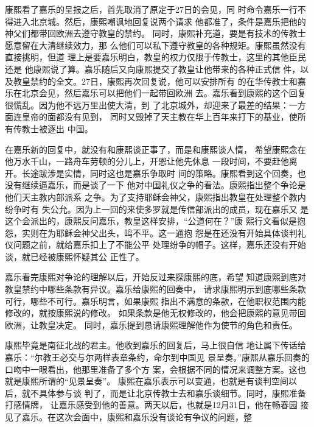 \par
康熙看了嘉乐的呈报之后，首先取消了原定于27日的会见，同%
时命令嘉乐一行不得进入北京城。然后，康熙嘲讽地回复说两个请求%
他都准了，条件是嘉乐把他的神父们都带回欧洲去遵守教皇的禁约。%
同时，康熙补充道，要是有技术的传教士愿意留在大清继续效力，那%
么他们可以私下遵守教皇的各种规矩。康熙虽然没有直接挑明，但道%
理上是要嘉乐明白，教皇的权力仅限于传教士，这里的其他臣民还是%
他康熙说了算。嘉乐随后又向康熙提交了教皇让他带来的各种正式信%
件，以及教皇禁约的全文。27日，康熙再次回复说，他可以安排所有%
的在华传教士和嘉乐在北京会见，然后嘉乐可以把他们一起带回欧洲%
去。嘉乐看到康熙的这个回复很慌乱。因为他不远万里出使大清，到%
了北京城外，却迎来了最差的结果：一方面连皇帝的面都没有见到，%
同时又毁掉了天主教在华上百年来打下的基业，使所有传教士被逐出%
中国。%
\par
在嘉乐新的回复中，就没有和康熙谈正事了，而是和康熙谈人情，%
希望康熙念在他万水千山，一路舟车劳顿的分儿上，开恩让他先休息%
一段时间，不要赶他离开。长途跋涉是实情，同时这也是嘉乐争取时%
间的策略。康熙看到这个回奏，也没有继续逼嘉乐，而是谈了一下%
他对中国礼仪之争的看法。康熙指出整个争论是他们天主教内部派系%
之争。为了支持耶稣会神父，康熙指出教皇在处理整个教内纷争时有%
失公允。因为上一回的来使多罗就是传信部派出的成员，现在嘉乐又%
是这个会派出的，康熙反问嘉乐，教皇这样安排，“公道何在？”康%
熙行文看似是抱怨，实则在为耶稣会神父出头，鸣不平。这一通抱%
怨是在还没有开始具体谈判礼仪问题之前，就给嘉乐扣上了不能公平%
处理纷争的帽子。这样，嘉乐还没有开始谈，就已经被康熙怀疑其公%
正性了。%
\par
嘉乐看完康熙对争论的理解以后，开始反过来探康熙的底，希望%
知道康熙到底对教皇禁约中哪些条款有异议。嘉乐给康熙的回奏中，%
请求康熙明示到底哪些条款可行，哪些不可行。嘉乐明言，如果康熙%
指出不满意的条款，在他职权范围内能修改的，就按康熙说的修改。%
如果条款是他无权修改的，他会把康熙的意见带回欧洲，让教皇决定。%
同时，嘉乐提到恳请康熙理解他作为使节的角色和责任。%
\par
康熙毕竟是南征北战的君主。他收到嘉乐的回复后，马上很自信%
地让属下传话给嘉乐：“尔教王必交与尔两样表章条约，命尔到中国见%
景呈奏。”康熙从嘉乐回奏的口吻中一眼看出，他那里准备了多个方%
案，会根据不同的情况来调整方案。这也就是康熙所谓的“见景呈奏”。%
康熙在嘉乐表示可以变通，也就是有谈判空间以后，就不具体参与谈%
判了，而是让北京传教士去和嘉乐谈细节。同时，康熙准备打感情牌，%
让嘉乐感受到他的善意。两天以后，也就是12月31日，他在畅春园%
接见了嘉乐。在这次会面中，康熙和嘉乐没有谈论有争议的问题，整%
